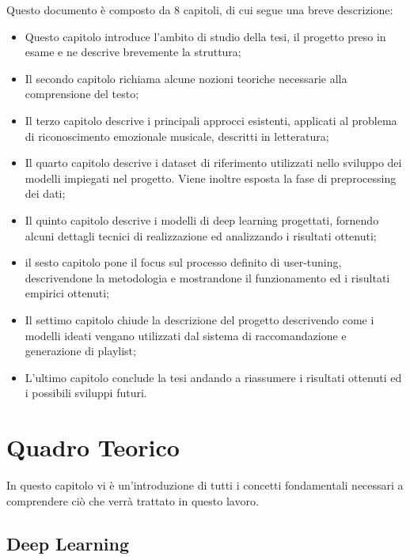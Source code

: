 \documentclass[11pt]{report}
\begin{document}
Questo documento è composto da 8 capitoli, di cui segue una breve descrizione:

\begin{itemize}

    \item Questo capitolo introduce l'ambito di studio della tesi, il progetto preso in esame e ne descrive brevemente la struttura;
    
    \item Il secondo capitolo richiama alcune nozioni teoriche necessarie alla comprensione del testo;
    
    \item Il terzo capitolo descrive i principali approcci esistenti, applicati al problema di riconoscimento emozionale musicale, descritti in letteratura;

    \item Il quarto capitolo descrive i dataset di riferimento utilizzati nello sviluppo dei modelli impiegati nel progetto. Viene inoltre esposta la fase di preprocessing dei dati;
    
    \item Il quinto capitolo descrive i modelli di deep learning progettati, fornendo alcuni dettagli tecnici di realizzazione ed analizzando i risultati ottenuti;
    
    \item il sesto capitolo pone il focus sul processo definito di user-tuning, descrivendone la metodologia e mostrandone il funzionamento ed i risultati empirici ottenuti;
    
    \item Il settimo capitolo chiude la descrizione del progetto descrivendo come i modelli ideati vengano utilizzati dal sistema di raccomandazione e generazione di playlist;
    
    \item L'ultimo capitolo conclude la tesi andando a riassumere i risultati ottenuti ed i possibili sviluppi futuri.
\end{itemize}

\chapter{Quadro Teorico}

In questo capitolo vi è un'introduzione di tutti i concetti fondamentali necessari a comprendere ciò che verrà trattato in questo lavoro.


\section{Deep Learning}
\end{document}
